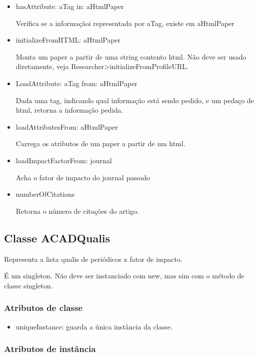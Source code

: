 \begin{itemize}

  \item hasAttribute: aTag in: aHtmlPaper

  Verifica se a informaçãoi representada por aTag, existe em aHtmlPaper

  \item initializeFromHTML: aHtmlPaper

  Monta um paper a partir de uma string contento html. Não deve ser usado diretamente, veja   Researcher>initializeFromProfileURL.

  \item LoadAttribute: aTag from: aHtmlPaper

  Dada uma tag, indicando qual informação está sendo pedido, e um pedaço de html, retorna a   informação pedida.

  \item loadAttributesFrom: aHtmlPaper

  Carrega os atributos de um paper a partir de um html.

  \item loadImpactFactorFrom: journal

  Acha o fator de impacto do journal passado

  \item numberOfCitations

  Retorna o número de citações do artigo.

\end{itemize}

\subsection{Classe ACADQualis}

Representa a lista qualis de periódicos x fator de impacto.

É um singleton. Não deve ser instanciado com new, mas sim com o método de classe singleton.

\subsubsection{Atributos de classe}

\begin{itemize}
  \item uniqueInstance: guarda a única instância da classe.
\end{itemize}

\subsubsection{Atributos de instância}

